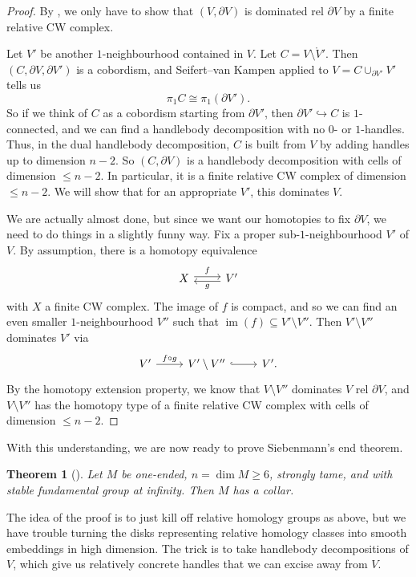 \documentclass[a4paper, 12pt]{article}
\newtheorem{thm}{Theorem}[section]
\theoremstyle{definition}
\DeclareMathOperator\im{im}
\begin{document}
\begin{proof}
  By , we only have to show that $(V, \partial V)$ is dominated rel $\partial V$ by a finite relative CW complex.

  Let $V'$ be another $1$-neighbourhood contained in $V$. Let $C = V \setminus \mathring{V}'$. Then $(C, \partial V, \partial V')$ is a cobordism, and Seifert--van Kampen applied to $V = C \cup_{\partial V'} V'$ tells us
  \[
    \pi_1 C \cong \pi_1(\partial V').
  \]
  So if we think of $C$ as a cobordism starting from $\partial V'$, then $\partial V' \hookrightarrow C$ is $1$-connected, and we can find a handlebody decomposition with no $0$- or $1$-handles. Thus, in the dual handlebody decomposition, $C$ is built from $V$ by adding handles up to dimension $n - 2$. So $(C, \partial V)$ is a handlebody decomposition with cells of dimension $\leq n - 2$. In particular, it is a finite relative CW complex of dimension $\leq n - 2$. We will show that for an appropriate $V'$, this dominates $V$.

  We are actually almost done, but since we want our homotopies to fix $\partial V$, we need to do things in a slightly funny way. Fix a proper sub-$1$-neighbourhood $V'$ of $V$. By assumption, there is a homotopy equivalence
  \[
    \begin{tikzcd}
      X \ar[r, yshift=2, "f"] & V' \ar[l, yshift=-2, "g"]
    \end{tikzcd}
  \]
  with $X$ a finite CW complex. The image of $f$ is compact, and so we can find an even smaller $1$-neighbourhood $V''$ such that $\im(f) \subseteq V' \setminus V''$. Then $V' \setminus V''$ dominates $V'$ via
  \[
    \begin{tikzcd}
      V' \ar[r, "f \circ g"] & V' \setminus V'' \ar[r, hook] & V'.
    \end{tikzcd}
  \]
  By the homotopy extension property, we know that $V \setminus V''$ dominates $V$ rel $\partial V$, and $V \setminus V''$ has the homotopy type of a finite relative CW complex with cells of dimension $\leq n - 2$.
\end{proof}

With this understanding, we are now ready to prove Siebenmann's end theorem.
\begin{thm}[\cite{siebenmann-thesis}]\label{thm:end}
  Let $M$ be one-ended, $n = \dim M \geq 6$, strongly tame, and with stable fundamental group at infinity. Then $M$ has a collar.
\end{thm}

The idea of the proof is to just kill off relative homology groups as above, but we have trouble turning the disks representing relative homology classes into smooth embeddings in high dimension. The trick is to take handlebody decompositions of $V$, which give us relatively concrete handles that we can excise away from $V$.
\end{document}
